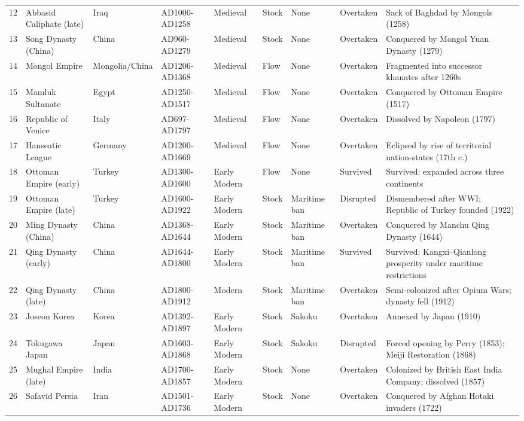 \documentclass[11pt]{article}
\begin{document}
\begin{longtable}{rlllllllp{6cm}}
12 & Abbasid Caliphate (late) & Iraq & AD1000-AD1258 & Medieval & Stock & None & Overtaken & Sack of Baghdad by Mongols (1258) \\
13 & Song Dynasty (China) & China & AD960-AD1279 & Medieval & Stock & None & Overtaken & Conquered by Mongol Yuan Dynasty (1279) \\
14 & Mongol Empire & Mongolia/China & AD1206-AD1368 & Medieval & Flow & None & Overtaken & Fragmented into successor khanates after 1260s \\
15 & Mamluk Sultanate & Egypt & AD1250-AD1517 & Medieval & Flow & None & Overtaken & Conquered by Ottoman Empire (1517) \\
16 & Republic of Venice & Italy & AD697-AD1797 & Medieval & Flow & None & Overtaken & Dissolved by Napoleon (1797) \\
17 & Hanseatic League & Germany & AD1200-AD1669 & Medieval & Flow & None & Overtaken & Eclipsed by rise of territorial nation-states (17th c.) \\
18 & Ottoman Empire (early) & Turkey & AD1300-AD1600 & Early Modern & Flow & None & Survived & Survived: expanded across three continents \\
19 & Ottoman Empire (late) & Turkey & AD1600-AD1922 & Early Modern & Stock & Maritime ban & Disrupted & Dismembered after WWI; Republic of Turkey founded (1922) \\
20 & Ming Dynasty (China) & China & AD1368-AD1644 & Early Modern & Stock & Maritime ban & Overtaken & Conquered by Manchu Qing Dynasty (1644) \\
21 & Qing Dynasty (early) & China & AD1644-AD1800 & Early Modern & Stock & Maritime ban & Survived & Survived: Kangxi--Qianlong prosperity under maritime restrictions \\
22 & Qing Dynasty (late) & China & AD1800-AD1912 & Modern & Stock & Maritime ban & Overtaken & Semi-colonized after Opium Wars; dynasty fell (1912) \\
23 & Joseon Korea & Korea & AD1392-AD1897 & Early Modern & Stock & Sakoku & Overtaken & Annexed by Japan (1910) \\
24 & Tokugawa Japan & Japan & AD1603-AD1868 & Early Modern & Stock & Sakoku & Disrupted & Forced opening by Perry (1853); Meiji Restoration (1868) \\
25 & Mughal Empire (late) & India & AD1700-AD1857 & Early Modern & Stock & None & Overtaken & Colonized by British East India Company; dissolved (1857) \\
26 & Safavid Persia & Iran & AD1501-AD1736 & Early Modern & Stock & None & Overtaken & Conquered by Afghan Hotaki invaders (1722) \\

\end{longtable}
\end{document}
